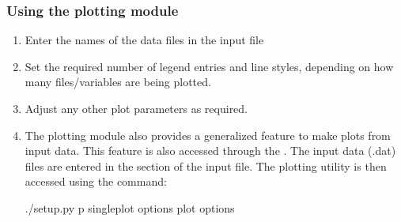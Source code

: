 \documentclass[letterpaper,10pt,english]{sphinxmanual}
\begin{document}
\subsubsection{Using the plotting module}
\label{\detokenize{couettepyfiles/plot:using-the-plotting-module}}\begin{enumerate}
\item {} 
Enter the names of the data files in the input file

\item {} 
Set the required number of legend entries and line styles, depending on  how many files/variables are being plotted.

\item {} 
Adjust any other plot parameters as required.

\item {} 
The plotting module also provides a generalized feature to make plots from input data. This feature is also accessed through the . The input data (.dat) files are entered in the  section of the input file. The plotting utility is then accessed using the command:

\begin{sphinxVerbatim}[commandchars=\\\{\}]
\PYGZdl{} ./setup.py \PYGZhy{}p single\PYGZus{}plot options \PYGZdq{}\PYGZob{}\PYGZlt{}plot options\PYGZgt{}\PYGZcb{}\PYGZdq{}
\end{sphinxVerbatim}

\end{enumerate}
\end{document}
